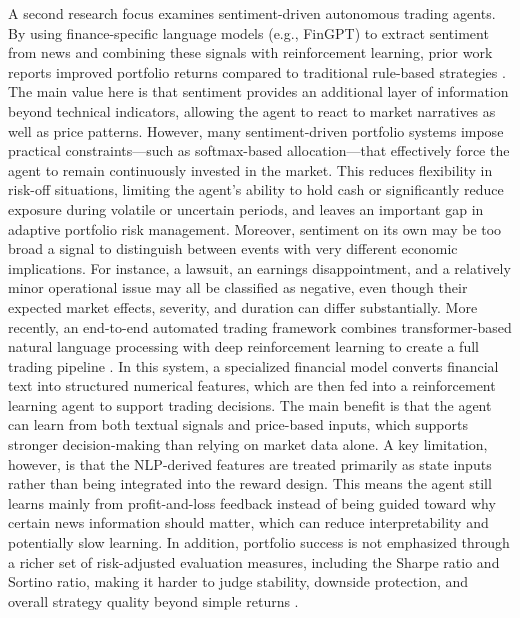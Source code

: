 \documentclass[a4paper,fleqn]{cas-sc}
\begin{document}
A second research focus examines sentiment-driven autonomous trading agents. By using finance-specific language models (e.g., FinGPT) to extract sentiment from news and combining these signals with reinforcement learning, prior work reports improved portfolio returns compared to traditional rule-based strategies \cite{fourteen} . The main value here is that sentiment provides an additional layer of information beyond technical indicators, allowing the agent to react to market narratives as well as price patterns. However, many sentiment-driven portfolio systems impose practical constraints—such as softmax-based allocation—that effectively force the agent to remain continuously invested in the market. This reduces flexibility in risk-off situations, limiting the agent’s ability to hold cash or significantly reduce exposure during volatile or uncertain periods, and leaves an important gap in adaptive portfolio risk management. Moreover, sentiment on its own may be too broad a signal to distinguish between events with very different economic implications. For instance, a lawsuit, an earnings disappointment, and a relatively minor operational issue may all be classified as negative, even though their expected market effects, severity, and duration can differ substantially. 
More recently, an end-to-end automated trading framework combines transformer-based natural language processing with deep reinforcement learning to create a full trading pipeline \cite{schulman2017ppo}. In this system, a specialized financial model converts financial text into structured numerical features, which are then fed into a reinforcement learning agent to support trading decisions. The main benefit is that the agent can learn from both textual signals and price-based inputs, which supports stronger decision-making than relying on market data alone. A key limitation, however, is that the NLP-derived features are treated primarily as state inputs rather than being integrated into the reward design. This means the agent still learns mainly from profit-and-loss feedback instead of being guided toward why certain news information should matter, which can reduce interpretability and potentially slow learning. In addition, portfolio success is not emphasized through a richer set of risk-adjusted evaluation measures, including the Sharpe ratio and Sortino ratio, making it harder to judge stability, downside protection, and overall strategy quality beyond simple returns . 
\end{document}
